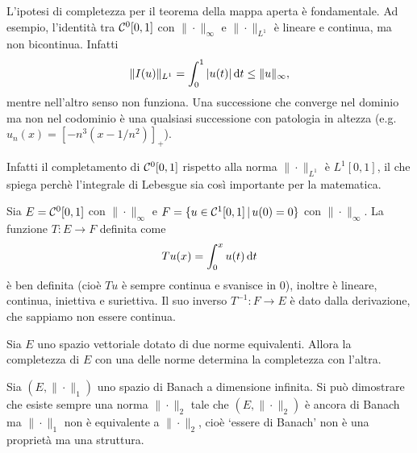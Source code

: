\begin{remark}
	L'ipotesi di completezza per il teorema della mappa aperta è fondamentale. Ad esempio, l'identità tra $\mathcal{C}^0[0,1]$ con $\|\cdot\|_\infty$ e $\|\cdot\|_{L^1}$ è lineare e continua, ma non bicontinua. Infatti
	\begin{equation*}
		\|I(u)\|_{L^1} = \int_0^1 |u(t)|\,\mathrm{d} t \leq \|u\|_\infty,
	\end{equation*}
	mentre nell'altro senso non funziona. Una successione che converge nel dominio ma non nel codominio è una qualsiasi successione con patologia in altezza (e.g. $u_n(x) = [-n^3(x-1/n^2)]_+$).
\end{remark}

Infatti il completamento di $\mathcal{C}^0[0,1]$ rispetto alla norma $\|\cdot\|_{L^1}$ è $L^1[0,1]$, il che spiega perchè l'integrale di Lebesgue sia così importante per la matematica.

\begin{example}
	Sia $E = \mathcal{C}^0[0,1]$ con $\|\cdot\|_\infty$ e $F = \{ u \in \mathcal{C}^1[0,1] \,|\, u(0) = 0\}$ con $\|\cdot\|_\infty$.
	La funzione $T:E \to F$ definita come
	\begin{equation*}
		Tu (x) = \int_0^x u(t)\,\mathrm{d} t
	\end{equation*}
	è ben definita (cioè $Tu$ è sempre continua e svanisce in $0$), inoltre è lineare, continua, iniettiva e suriettiva. Il suo inverso $T^{-1} : F \to E$ è dato dalla derivazione, che sappiamo non essere continua.
\end{example}

\begin{corollary}
	Sia $E$ uno spazio vettoriale dotato di due norme equivalenti.
	Allora la completezza di $E$ con una delle norme determina la completezza con l'altra.
\end{corollary}

\begin{remark}
	Sia $(E, \|\cdot\|_1)$ uno spazio di Banach a dimensione infinita.
	Si può dimostrare che esiste sempre una norma $\|\cdot\|_2$ tale che $(E, \|\cdot\|_2)$ è ancora di Banach ma $\|\cdot\|_1$ non è equivalente a $\|\cdot\|_2$, cioè `essere di Banach' non è una proprietà ma una struttura.
\end{remark}

